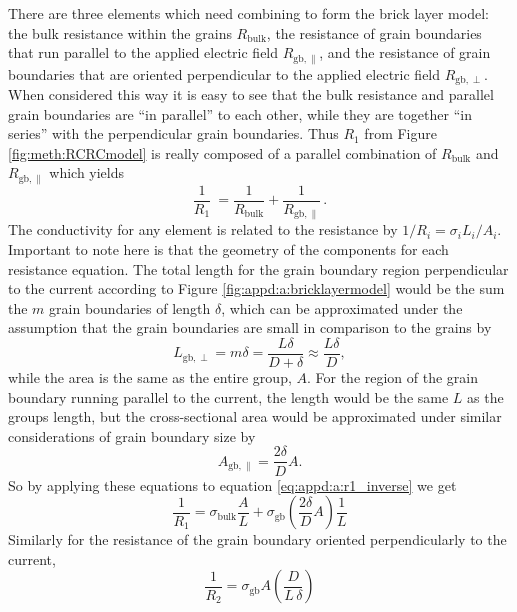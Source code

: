 There are three elements which need combining to form the brick layer model: the bulk resistance within the grains $R_{\mathrm{bulk}}$, the resistance of grain boundaries that run parallel to the applied electric field $R_{\mathrm{gb,}\parallel}$, and the resistance of grain boundaries that are oriented perpendicular to the applied electric field $R_{\mathrm{gb,}\perp}$. When considered this way it is easy to see that the bulk resistance and parallel grain boundaries are ``in parallel'' to each other, while they are together ``in series'' with the perpendicular grain boundaries. Thus $R_1$ from Figure \ref{fig:meth:RCRCmodel} is really composed of a parallel combination of $R_{\mathrm{bulk}}$ and $R_{\mathrm{gb,}\parallel}$ which yields 
\begin{equation}
    \frac{1}{R_1}\ = \frac{1}{R_{\mathrm{bulk}}}+\frac{1}{R_{\mathrm{gb,}\parallel}}\,.
    \label{eq:appd:a:r1_inverse}
\end{equation}
The conductivity for any element is related to the resistance by $1/R_i=\sigma_i L_i/A_i$. Important to note here is that the geometry of the components for each resistance equation. The total length for the grain boundary region perpendicular to the current according to Figure \ref{fig:appd:a:bricklayermodel} would be the sum the $m$ grain boundaries of length $\delta$, which can be approximated under the assumption that the grain boundaries are small in comparison to the grains by 
\begin{equation*}
L_{\mathrm{gb,\perp}} = m\delta = \frac{L \delta}{D + \delta} \approx \dfrac{L\delta}{D},
\end{equation*}
while the area is the same as the entire group, $A$. For the region of the grain boundary running parallel to the current, the length would be the same $L$ as the groups length, but the cross-sectional area would be approximated under similar considerations of grain boundary size by 
\begin{equation*}
    A_{\mathrm{gb,\parallel}}=\frac{2\delta}{D}A.
\end{equation*}
So by applying these equations to equation \ref{eq:appd:a:r1_inverse} we get
\begin{equation}
    \frac{1}{R_1} = \sigma_{\mathrm{bulk}}\frac{A}{L}+\sigma_{\mathrm{gb}}\left(\frac{2\delta}{D}A\right)\frac{1}{L}
    \label{eq:appd:r1_inverse_from_sb_sgb}
\end{equation}
Similarly for the resistance of the grain boundary oriented perpendicularly to the current,
\begin{equation}
    \frac{1}{R_2} =\sigma_{\mathrm{gb}}A\left(\frac{D}{L\, \delta}\right)
    \label{eq:appd:r2_inverse_from_s_gb}
\end{equation}
